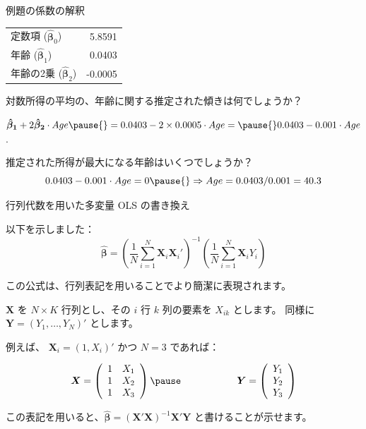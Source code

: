 \documentclass[11pt,handout]{beamer}
\newenvironment{wideitemize}{\itemize\addtolength{\itemsep}{10pt}}{\enditemize}
\begin{document}
\begin{frame}{例題の係数の解釈}
		\begin{tabular}{lr}
		定数項 ($\bm\hat\beta_0$) & 5.8591 \\
		年齢 ($\bm\hat\beta_1$) & 0.0403 \\
		年齢の2乗 ($\bm\hat\beta_2$) & -0.0005
	\end{tabular}
\medskip
	
\begin{wideitemize}
	\item
	対数所得の平均の、年齢に関する推定された傾きは何でしょうか？ \pause
	
	\item
	$\bm{\hat\beta_1} + 2 \bm{\hat\beta_2} \cdot Age \pause{} = 0.0403 - 2 \times 0.0005\cdot Age =  \pause{} 0.0403 - 0.001 \cdot Age$.
	
	\pause
	\item
	推定された所得が最大になる年齢はいくつでしょうか？ \pause
	$$0.0403 - 0.001 \cdot Age = 0 \pause{} \Rightarrow Age = 0.0403 / 0.001 = 40.3 $$
	
\end{wideitemize}	
\end{frame}
	
	\begin{frame}{行列代数を用いた多変量 OLS の書き換え}
		\begin{wideitemize}
		
		\item
		以下を示しました：
		$$ \bm{\hat\beta} = \left( \frac{1}{N} \sum_{i=1}^N \bm{X}_i \bm{X}_i' \right)^{-1}  \left( \frac{1}{N} \sum_{i=1}^N \bm{X}_i Y_i \right)$$
		
		\item
		この公式は、行列表記を用いることでより簡潔に表現されます。
		
		\pause
		\item
		$\bm{X}$ を $N \times K$ 行列とし、その $i$ 行 $k$ 列の要素を $X_{ik}$ とします。 \pause 同様に $\bm{Y} = (Y_1, \dots, Y_N)'$ とします。
		
		\pause
		\item
		例えば、 $\bm{X}_i = (1, X_i)'$ かつ $N=3$ であれば：
		
		$$\bm{X} = \left( \begin{array}{rr} 1 & X_{1} \\ 1 & X_{2} \\ 1 & X_{3}   \end{array}  \right) \pause \hspace{2cm} \bm{Y} = \left( \begin{array}{r} Y_{1} \\Y_{2} \\ Y_{3}   \end{array}  \right)$$
		
		\pause
		\item
		この表記を用いると、$\bm{\hat\beta} = \left(\bm{X'X}\right)^{-1} \bm{X}'\bm{Y}$ と書けることが示せます。
	\end{wideitemize}	
		
	\end{frame}
	
\end{document}
